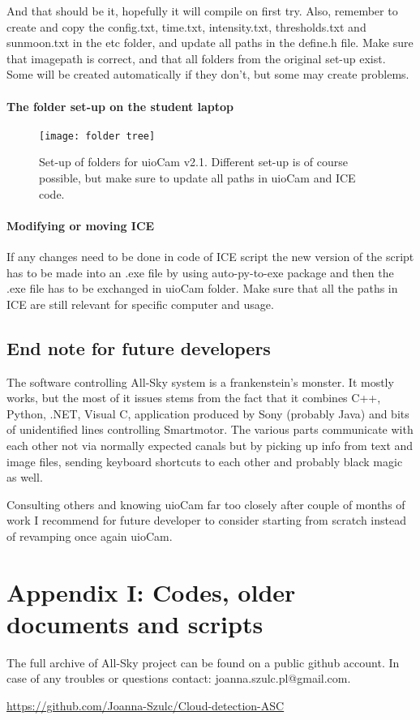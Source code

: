\documentclass[]{book}
\begin{document}
	And that should be it, hopefully it will compile on first try. Also, remember to create and copy the config.txt, time.txt, intensity.txt, thresholds.txt and sunmoon.txt in the etc folder, and update all paths in the define.h file. Make sure that imagepath is correct, and that all folders from the original set-up exist. Some will be created automatically if they don't, but some may create problems.
	
	\paragraph{The folder set-up on the student laptop}
	
	\begin{figure}
		\centering
		\texttt{[image: folder tree]}
		\label{fig: folder tree}
		\caption{Set-up of folders for uioCam v2.1. Different set-up is of course possible, but make sure to update all paths in uioCam and ICE code.}
	\end{figure}
	
	\paragraph{Modifying or moving ICE}
	If any changes need to be done in code of ICE script the new version of the script has to be made into an .exe file by using auto-py-to-exe package and then the .exe file has to be exchanged in uioCam folder. Make sure that all the paths in ICE are still relevant for specific computer and usage.
	
	\subsection{End note for future developers}
	
	The software controlling All-Sky system is a frankenstein's monster. It mostly works, but the most of it issues stems from the fact that it combines C++, Python, .NET, Visual C, application produced by Sony (probably Java) and bits of unidentified lines controlling Smartmotor. The various parts communicate with each other not via normally expected canals but by picking up info from text and image files, sending keyboard shortcuts to each other and probably black magic as well.
	
	Consulting others and knowing uioCam far too closely after couple of months of work I recommend for future developer to consider starting from scratch instead of revamping once again uioCam.

\section{Appendix I: Codes, older documents and scripts}

	The full archive of All-Sky project can be found on a public github account. In case of any troubles or questions contact: joanna.szulc.pl@gmail.com.
	
	\url{https://github.com/Joanna-Szulc/Cloud-detection-ASC}



\end{document}
